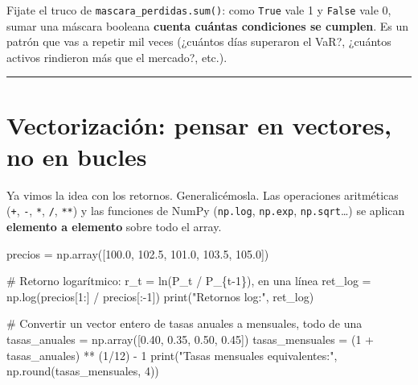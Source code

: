 \documentclass[
  spanish,
  letterpaper,
  DIV=11,
  numbers=noendperiod]{scrreprt}
\newenvironment{Shaded}{\begin{snugshade}}{\end{snugshade}}
\newcommand{\BuiltInTok}[1]{\textcolor[rgb]{0.00,0.23,0.31}{#1}}
\newcommand{\CommentTok}[1]{\textcolor[rgb]{0.37,0.37,0.37}{#1}}
\newcommand{\DecValTok}[1]{\textcolor[rgb]{0.68,0.00,0.00}{#1}}
\newcommand{\FloatTok}[1]{\textcolor[rgb]{0.68,0.00,0.00}{#1}}
\newcommand{\NormalTok}[1]{\textcolor[rgb]{0.00,0.23,0.31}{#1}}
\newcommand{\OperatorTok}[1]{\textcolor[rgb]{0.37,0.37,0.37}{#1}}
\newcommand{\StringTok}[1]{\textcolor[rgb]{0.13,0.47,0.30}{#1}}
\begin{document}
Fijate el truco de \texttt{mascara\_perdidas.sum()}: como \texttt{True}
vale 1 y \texttt{False} vale 0, sumar una máscara booleana
\textbf{cuenta cuántas condiciones se cumplen}. Es un patrón que vas a
repetir mil veces (¿cuántos días superaron el VaR?, ¿cuántos activos
rindieron más que el mercado?, etc.).

\begin{center}\rule{0.5\linewidth}{0.5pt}\end{center}

\section{Vectorización: pensar en vectores, no en
bucles}\label{vectorizaciuxf3n-pensar-en-vectores-no-en-bucles}

Ya vimos la idea con los retornos. Generalicémosla. Las operaciones
aritméticas (\texttt{+}, \texttt{-}, \texttt{*}, \texttt{/},
\texttt{**}) y las funciones de NumPy (\texttt{np.log}, \texttt{np.exp},
\texttt{np.sqrt}\ldots) se aplican \textbf{elemento a elemento} sobre
todo el array.

\label{vectorizacion}
\begin{Shaded}
\begin{Highlighting}[]
\NormalTok{precios }\OperatorTok{=}\NormalTok{ np.array([}\FloatTok{100.0}\NormalTok{, }\FloatTok{102.5}\NormalTok{, }\FloatTok{101.0}\NormalTok{, }\FloatTok{103.5}\NormalTok{, }\FloatTok{105.0}\NormalTok{])}

\CommentTok{\# Retorno logarítmico: r\_t = ln(P\_t / P\_\{t{-}1\}), en una línea}
\NormalTok{ret\_log }\OperatorTok{=}\NormalTok{ np.log(precios[}\DecValTok{1}\NormalTok{:] }\OperatorTok{/}\NormalTok{ precios[:}\OperatorTok{{-}}\DecValTok{1}\NormalTok{])}
\BuiltInTok{print}\NormalTok{(}\StringTok{"Retornos log:"}\NormalTok{, ret\_log)}

\CommentTok{\# Convertir un vector entero de tasas anuales a mensuales, todo de una}
\NormalTok{tasas\_anuales }\OperatorTok{=}\NormalTok{ np.array([}\FloatTok{0.40}\NormalTok{, }\FloatTok{0.35}\NormalTok{, }\FloatTok{0.50}\NormalTok{, }\FloatTok{0.45}\NormalTok{])}
\NormalTok{tasas\_mensuales }\OperatorTok{=}\NormalTok{ (}\DecValTok{1} \OperatorTok{+}\NormalTok{ tasas\_anuales) }\OperatorTok{**}\NormalTok{ (}\DecValTok{1}\OperatorTok{/}\DecValTok{12}\NormalTok{) }\OperatorTok{{-}} \DecValTok{1}
\BuiltInTok{print}\NormalTok{(}\StringTok{"Tasas mensuales equivalentes:"}\NormalTok{, np.}\BuiltInTok{round}\NormalTok{(tasas\_mensuales, }\DecValTok{4}\NormalTok{))}
\end{Highlighting}
\end{Shaded}
\end{document}
